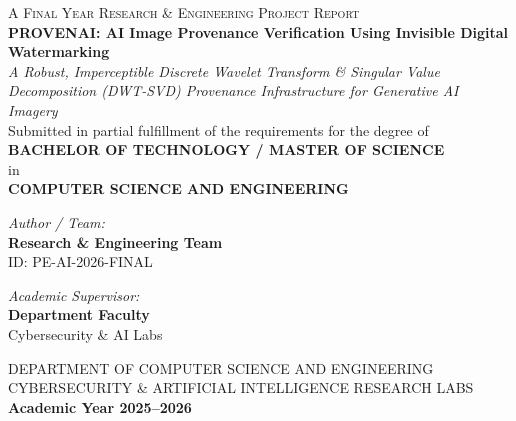 \documentclass[12pt,a4paper]{report}
\begin{document}
\begin{titlepage}
    \centering
    \vspace*{0.5cm}
    
    {\Large\scshape A Final Year Research \& Engineering Project Report}\\[1.5cm]
    
    {\huge\bfseries\color{blue!60!black} PROVENAI: AI Image Provenance Verification Using Invisible Digital Watermarking}\\[0.8cm]
    
    {\large\itshape A Robust, Imperceptible Discrete Wavelet Transform \& Singular Value Decomposition (DWT-SVD) Provenance Infrastructure for Generative AI Imagery}\\[2.0cm]
    
    {\large Submitted in partial fulfillment of the requirements for the degree of}\\[0.3cm]
    {\large\bfseries BACHELOR OF TECHNOLOGY / MASTER OF SCIENCE}\\[0.2cm]
    {\large in}\\[0.2cm]
    {\large\bfseries COMPUTER SCIENCE AND ENGINEERING}\\[2.0cm]
    
    \begin{minipage}{0.48\textwidth}
        \begin{flushleft} \large
            \emph{Author / Team:}\\
            \textbf{Research \& Engineering Team}\\
            ID: PE-AI-2026-FINAL
        \end{flushleft}
    \end{minipage}
    \begin{minipage}{0.48\textwidth}
        \begin{flushright} \large
            \emph{Academic Supervisor:}\\
            \textbf{Department Faculty}\\
            Cybersecurity \& AI Labs
        \end{flushright}
    \end{minipage}
    
    \vfill
    {\large DEPARTMENT OF COMPUTER SCIENCE AND ENGINEERING\\
    CYBERSECURITY \& ARTIFICIAL INTELLIGENCE RESEARCH LABS\\
    \textbf{Academic Year 2025--2026}}
\end{titlepage}
\end{document}
